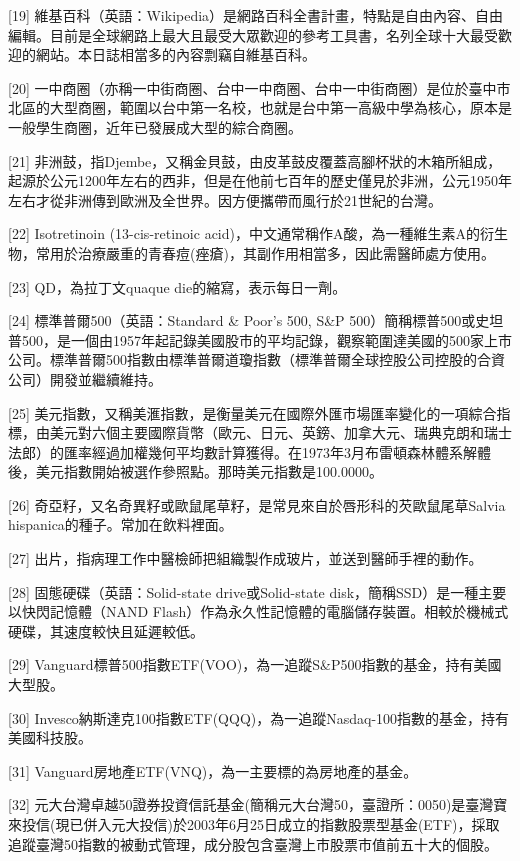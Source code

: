 \documentclass[
]{article}
\begin{document}
{[}19{]}
維基百科（英語：Wikipedia）是網路百科全書計畫，特點是自由內容、自由編輯。目前是全球網路上最大且最受大眾歡迎的參考工具書，名列全球十大最受歡迎的網站。本日誌相當多的內容剽竊自維基百科。

{[}20{]}
一中商圈（亦稱一中街商圈、台中一中商圈、台中一中街商圈）是位於臺中市北區的大型商圈，範圍以台中第一名校，也就是台中第一高級中學為核心，原本是一般學生商圈，近年已發展成大型的綜合商圈。

{[}21{]}
非洲鼓，指Djembe，又稱金貝鼓，由皮革鼓皮覆蓋高腳杯狀的木箱所組成，起源於公元1200年左右的西非，但是在他前七百年的歷史僅見於非洲，公元1950年左右才從非洲傳到歐洲及全世界。因方便攜帶而風行於21世紀的台灣。

{[}22{]} Isotretinoin (13-cis-retinoic
acid)，中文通常稱作A酸，為一種維生素A的衍生物，常用於治療嚴重的青春痘(痤瘡)，其副作用相當多，因此需醫師處方使用。

{[}23{]} QD，為拉丁文quaque die的縮寫，表示每日一劑。

{[}24{]} 標準普爾500（英語：Standard \& Poor's 500, S\&P
500）簡稱標普500或史坦普500，是一個由1957年起記錄美國股市的平均記錄，觀察範圍達美國的500家上市公司。標準普爾500指數由標準普爾道瓊指數（標準普爾全球控股公司控股的合資公司）開發並繼續維持。

{[}25{]}
美元指數，又稱美滙指數，是衡量美元在國際外匯市場匯率變化的一項綜合指標，由美元對六個主要國際貨幣（歐元、日元、英鎊、加拿大元、瑞典克朗和瑞士法郎）的匯率經過加權幾何平均數計算獲得。在1973年3月布雷頓森林體系解體後，美元指數開始被選作參照點。那時美元指數是100.0000。

{[}26{]}
奇亞籽，又名奇異籽或歐鼠尾草籽，是常見來自於唇形科的芡歐鼠尾草Salvia
hispanica的種子。常加在飲料裡面。

{[}27{]}
出片，指病理工作中醫檢師把組織製作成玻片，並送到醫師手裡的動作。

{[}28{]} 固態硬碟（英語：Solid-state drive或Solid-state
disk，簡稱SSD）是一種主要以快閃記憶體（NAND
Flash）作為永久性記憶體的電腦儲存裝置。相較於機械式硬碟，其速度較快且延遲較低。

{[}29{]}
Vanguard標普500指數ETF(VOO)，為一追蹤S\&P500指數的基金，持有美國大型股。

{[}30{]}
Invesco納斯達克100指數ETF(QQQ)，為一追蹤Nasdaq-100指數的基金，持有美國科技股。

{[}31{]} Vanguard房地產ETF(VNQ)，為一主要標的為房地產的基金。

{[}32{]}
元大台灣卓越50證券投資信託基金(簡稱元大台灣50，臺證所：0050)是臺灣寶來投信(現已併入元大投信)於2003年6月25日成立的指數股票型基金(ETF)，採取追蹤臺灣50指數的被動式管理，成分股包含臺灣上市股票市值前五十大的個股。
\end{document}
